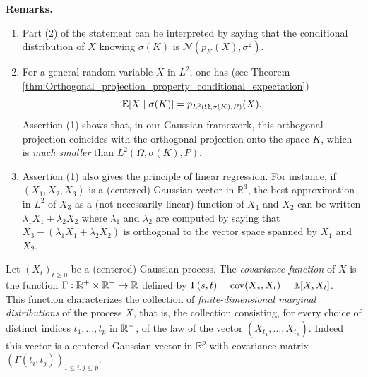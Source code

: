 \documentclass[../Main.tex]{subfiles}
\begin{document}

\noindent\textbf{Remarks.}
\begin{enumerate}
\item Part (2) of the statement can be interpreted by saying that the conditional distribution of $X$ knowing $\sigma(K)$ is $\mathcal N(p_K(X),\sigma^2)$.
\item For a general random variable $X$ in $L^2$, one has (see Theorem \ref{thm:Orthogonal_projection_property_conditional_expectation})
\[\mathbb{E}[X\mid \sigma(K)] = p_{L^2(\Omega,\sigma(K),P)}(X).\]
Assertion (1) shows that, in our Gaussian framework, this orthogonal projection coincides with the orthogonal projection onto the space $K$, which is \textit{much smaller} than $L^2(\Omega,\sigma(K),P)$.
\item Assertion (1) also gives the principle of linear regression. For instance, if $(X_1,X_2,X_3)$ is a (centered) Gaussian vector in $\mathbb R^3$, the best approximation in $L^2$ of $X_3$ as a (not necessarily linear) function of $X_1$ and $X_2$ can be written $\lambda_1 X_1 + \lambda_2 X_2$ where $\lambda_1$ and $\lambda_2$ are computed by saying that $X_3 - (\lambda_1 X_1+\lambda_2 X_2)$ is orthogonal to the vector space spanned by $X_1$ and $X_2$.
\end{enumerate}

Let $(X_t)_{t\geq 0}$ be a (centered) Gaussian process. The \emph{covariance function} of $X$ is the function $\Gamma : \mathbb{R}^+\times \mathbb{R}^+ \to \mathbb R$ defined by $\Gamma(s,t) = \mathrm{cov}(X_s,X_t) = \mathbb{E}[X_sX_t]$. \\ 
This function characterizes the collection of \emph{finite-dimensional marginal distributions} of the process $X$, that is, the collection consisting, for every choice of distinct indices $t_1,\dots,t_p$ in $\mathbb{R}^+$, of the law of the vector $(X_{t_1},\dots,X_{t_p})$. Indeed this vector is a centered Gaussian vector in $\mathbb R^p$ with covariance matrix $(\Gamma(t_i,t_j))_{1\leq i,j\leq p}$. 
\end{document}
